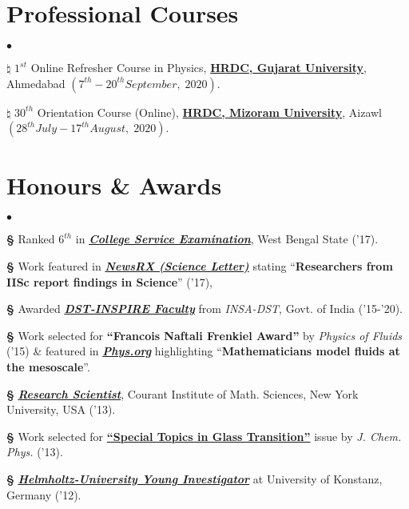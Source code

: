 \documentclass[margin,line]{res}
\newenvironment{list2}{
  \begin{list}{$\bullet$}{%
      \setlength{\itemsep}{0in}
      \setlength{\parsep}{0in} \setlength{\parskip}{0in}
      \setlength{\topsep}{0in} \setlength{\partopsep}{0in} 
      \setlength{\leftmargin}{0.2in}}}{\end{list}}
\begin{document}
\begin{resume}
\section{\sc Professional Courses}
\begin{list2}
\item[$\pmb{\natural}$] $1^{st}$ Online Refresher Course in Physics, {\bf \href{https://hrdc.gujaratuniversity.ac.in/}{HRDC, Gujarat University}}, 
Ahmedabad $(7^{th}-20^{th} September,\; 2020)$.
\item[$\pmb{\natural}$] $30^{th}$ Orientation Course (Online), {\bf \href{https://hrdcmzu.in/}{HRDC, Mizoram University}}, Aizawl $(28^{th} July - 17^{th} August,\; 2020)$.
\end{list2}
\vspace{1mm}

\section{\sc Honours \& Awards}
\begin{list2}
\item[{\bf \S}] Ranked {$6^{th}$} in \href{http://www.wbcsc.ac.in}{\textit{\textbf{College Service Examination}}}, West Bengal State ('17).
\item[{\bf \S}] Work featured in \href{http://info.newsrx.com/hubfs/Corresponding\ Author\ Email\ Campaigns/Science\ Letter\ 02.03.17.pdf}
{\textit{\textbf{NewsRX (Science Letter)}}} stating ``{\bf Researchers from IISc report findings in Science}'' ('17),
\item[{\bf \S}] Awarded \href{http://www.inspire-dst.gov.in/faculty_scheme.html}{\textit{\textbf{DST-INSPIRE Faculty}}} from {\it INSA-DST}, Govt. of India ('15-'20).
\item[{\bf \S}] Work selected for {\bf ``Francois Naftali Frenkiel Award''} by {\it Physics of Fluids} ('15) \& 
      featured in \href{http://phys.org/news/2015-03-mathematicians-fluids-mesoscale.html}{\textit{\textbf{Phys.org}}} highlighting 
      ``{\bf Mathematicians model fluids at the mesoscale}''. 
\item[{\bf \S}] \href{https://cims.nyu.edu/~donev/Group.html}{\textit{\textbf{Research Scientist}}}, Courant Institute of Math. Sciences, 
                      New York University, USA ('13).
\item[{\bf \S}] Work selected for \href{https://amitbny.github.io/akb.github.io/doc/JCP_ST.pdf}{\textbf{``Special Topics 
      in Glass Transition''}} issue by {\it J. Chem. Phys.} ('13). 
\item[{\bf \S}] \href{https://www.helmholtz.de/en/jobs_talent/funding_programs/helmholtz_young_investigators_groups/}{\textit{\textbf{Helmholtz-University Young Investigator}}} at University of Konstanz, Germany ('12).

\end{list2}
\end{resume}
\end{document}
